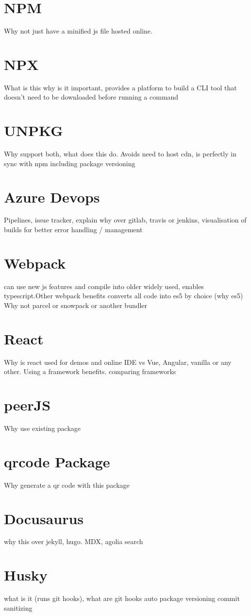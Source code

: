 \documentclass{l4proj}
\begin{document}
\section{NPM}
\text Why not just have a minified js file hosted online.
\section{NPX}
\text What is this why is it important, provides a platform to build a CLI tool that doesn’t need to be downloaded before running a command
\section{UNPKG}
\text Why support both, what does this do. Avoids need to host cdn, is perfectly in sync with npm including package versioning
\section{Azure Devops}
\text Pipelines, issue tracker, explain why over gitlab, travis or jenkins, visualisation of builds for better error handling / management
\section{Webpack}
\text can use new js features and compile into older widely used, enables typescript.Other webpack benefits converts all code into es5 by choice (why es5)
Why not parcel or snowpack or another bundler
\section{React}
\text Why is react used for demos and online IDE vs Vue, Angular, vanilla or any other. Using a framework benefits.
comparing frameworks
\section{peerJS}
\text Why use existing package
\section{qrcode Package}
\text Why generate a qr code with this package
\section{Docusaurus}
\text why this over jekyll, hugo. MDX, agolia search
\section{Husky}
\text what is it (runs git hooks), what are git hooks
auto package versioning
commit sanitizing
\end{document}

